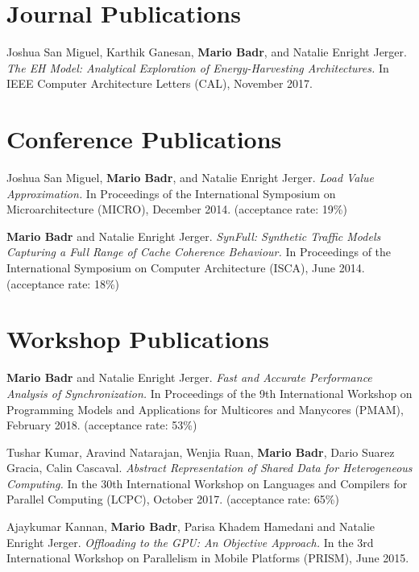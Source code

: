 \section{\sc Journal Publications}

\onecol
{
  Joshua San Miguel, Karthik Ganesan, \textbf{Mario Badr}, and Natalie Enright Jerger.
  \textit{The EH Model: Analytical Exploration of Energy-Harvesting Architectures.}
  In IEEE Computer Architecture Letters (CAL), November 2017.
}

\section{\sc Conference Publications}

\onecol
{
  Joshua San Miguel, \textbf{Mario Badr}, and Natalie Enright Jerger.
  \textit{Load Value Approximation.}
  In Proceedings of the International Symposium on Microarchitecture (MICRO), December 2014.
  (acceptance rate: 19\%)
}

\onecol
{
  \textbf{Mario Badr} and Natalie Enright Jerger.
  \textit{SynFull: Synthetic Traffic Models Capturing a Full Range of Cache Coherence Behaviour.}
  In Proceedings of the International Symposium on Computer Architecture (ISCA), June 2014.
  (acceptance rate: 18\%)
}

\section{\sc Workshop Publications}

\onecol
{
  \textbf{Mario Badr} and Natalie Enright Jerger.
  \textit{Fast and Accurate Performance Analysis of Synchronization.}
  In Proceedings of the 9th International Workshop on Programming Models and Applications for Multicores and Manycores (PMAM), February 2018.
  (acceptance rate: 53\%)
}

\onecol
{
  Tushar Kumar, Aravind Natarajan, Wenjia Ruan, \textbf{Mario Badr}, Dario Suarez Gracia, Calin Cascaval.
  \textit{Abstract Representation of Shared Data for Heterogeneous Computing.}
  In the 30th International Workshop on Languages and Compilers for Parallel Computing (LCPC), October 2017.
  (acceptance rate: 65\%)
}

\onecol
{
  Ajaykumar Kannan, \textbf{Mario Badr}, Parisa Khadem Hamedani and Natalie Enright Jerger.
  \textit{Offloading to the GPU: An Objective Approach.}
  In the 3rd International Workshop on Parallelism in Mobile Platforms (PRISM), June 2015.
}

